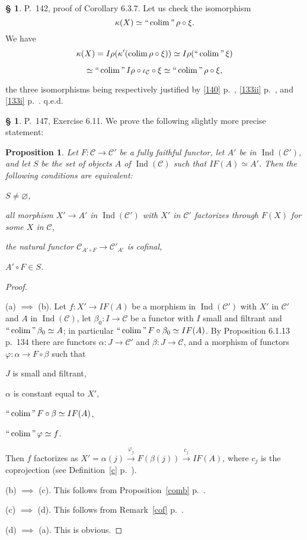 \documentclass[12pt]{article}
\newtheorem{prop}[thm]{Proposition}
\theoremstyle{remark}
\theoremstyle{definition}
\newtheorem{s}[thm]{\S}
\newcommand{\cc}{\mathcal}
\newcommand{\C}{\mathcal C}
\newcommand{\xr}{\xrightarrow}
\DeclareMathOperator*{\coli}{colim}
\DeclareMathOperator*{\co}{colim}
\DeclareMathOperator*{\ic}{``\coli"}
\DeclareMathOperator{\Ind}{Ind}
\begin{document}
%
%
\begin{s} P.~142, proof of Corollary 6.3.7. Let us check the isomorphism 
$$
\kappa(X)\simeq\ic\rho\circ\xi. 
$$ 
We have 
$$
\kappa(X)=I\rho(\kappa'(\co\rho\circ\xi))\simeq I\rho(\ic\xi)
$$

$$
\simeq\ic I\rho\circ\iota_\C\circ\xi\simeq\ic\rho\circ\xi, 
$$ 

\noindent the three isomorphisms being respectively justified by \eqref{140} p.~\pageref{140}, \eqref{133ii} p.~\pageref{133ii}, and \eqref{133i} p.~\pageref{133i}. q.e.d.
\end{s}
%
%
\begin{s} 
P.~147, Exercise 6.11. We prove the following slightly more precise statement: 
%
\begin{prop}\label{myprop1}
%
Let $F:\cc C\to\cc C'$ be a fully faithful functor, let $A'$ be in $\Ind(\cc C')$, and let $S$ be the set of objects $A$ of $\Ind(\cc C)$ such that $IF(A)\simeq A'$. Then the following conditions are equivalent: 

 $S\neq\varnothing$, 

 all morphism $X'\to A'$ in $\Ind(\cc C')$ with $X'$ in $\cc C'$ factorizes through $F(X)$ for some $X$ in $\cc C$, 

 the natural functor $\cc C_{A'\circ F}\to\cc C'_{A'}$ is cofinal, 

 $A'\circ F\in S$.
%
\end{prop}
%
\begin{proof}\ 

\noindent(a) $\implies$ (b). Let $f:X'\to IF(A)$ be a morphism in $\Ind(\cc C')$ with $X'$ in $\cc C'$ and $A$ in $\Ind(\cc C)$, let $\beta_0:I\to\cc C$ be a functor with $I$ small and filtrant and $\ic\beta_0\simeq A$; in particular $\ic F\circ\beta_0\simeq IF(A)$. By Proposition 6.1.13 p.~134 there are functors $\alpha:J\to\cc C'$ and $\beta:J\to\cc C$, and a morphism of functors $\varphi:\alpha\to F\circ\beta$ such that 

$J$ is small and filtrant, 

$\alpha$ is constant equal to $X'$, 

$\ic F\circ\beta\simeq IF(A)$, 

$\ic\varphi\simeq f$. 

\noindent Then $f$ factorizes as $X'=\alpha(j)\xr{\varphi_j}F(\beta(j))\xr{c_j}IF(A)$, where $c_j$ is the coprojection (see Definition~\ref{c} p.~\pageref{c}).

\noindent(b) $\implies$ (c). This follows from Proposition~\ref{comb} p.~\pageref{comb}. 

\noindent(c) $\implies$ (d). This follows from Remark~\ref{cof} p.~\pageref{cof}. 

\noindent(d) $\implies$ (a). This is obvious.
\end{proof}
\end{s}
\end{document}
